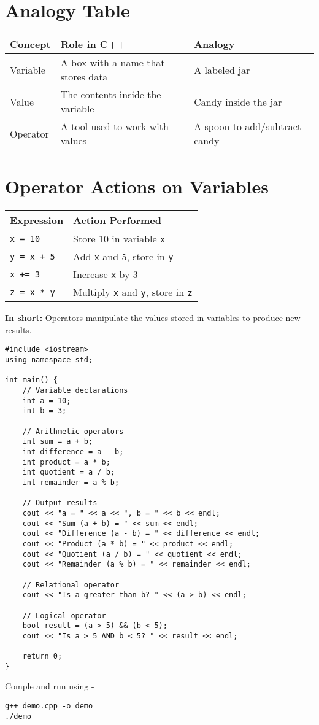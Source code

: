 \documentclass{article}
\begin{document}
\section{Analogy Table}

\begin{center}
\begin{tabular}{|l|l|l|}
\hline
\textbf{Concept} & \textbf{Role in C++} & \textbf{Analogy} \\
\hline
Variable & A box with a name that stores data & A labeled jar \\
Value & The contents inside the variable & Candy inside the jar \\
Operator & A tool used to work with values & A spoon to add/subtract candy \\
\hline
\end{tabular}
\end{center}

\section{Operator Actions on Variables}

\begin{center}
\begin{tabular}{|l|l|}
\hline
\textbf{Expression} & \textbf{Action Performed} \\
\hline
\texttt{x = 10} & Store 10 in variable \texttt{x} \\
\texttt{y = x + 5} & Add \texttt{x} and 5, store in \texttt{y} \\
\texttt{x += 3} & Increase \texttt{x} by 3 \\
\texttt{z = x * y} & Multiply \texttt{x} and \texttt{y}, store in \texttt{z} \\
\hline
\end{tabular}
\end{center}

\noindent\textbf{In short:} Operators manipulate the values stored in variables to produce new results.

\begin{lstlisting}[style=cppstyle]
#include <iostream>
using namespace std;

int main() {
    // Variable declarations
    int a = 10;
    int b = 3;

    // Arithmetic operators
    int sum = a + b;
    int difference = a - b;
    int product = a * b;
    int quotient = a / b;
    int remainder = a % b;

    // Output results
    cout << "a = " << a << ", b = " << b << endl;
    cout << "Sum (a + b) = " << sum << endl;
    cout << "Difference (a - b) = " << difference << endl;
    cout << "Product (a * b) = " << product << endl;
    cout << "Quotient (a / b) = " << quotient << endl;
    cout << "Remainder (a % b) = " << remainder << endl;

    // Relational operator
    cout << "Is a greater than b? " << (a > b) << endl;

    // Logical operator
    bool result = (a > 5) && (b < 5);
    cout << "Is a > 5 AND b < 5? " << result << endl;

    return 0;
}
\end{lstlisting}

Comple and run using - 
\begin{verbatim}
g++ demo.cpp -o demo
./demo  
\end{verbatim}
\end{document}
